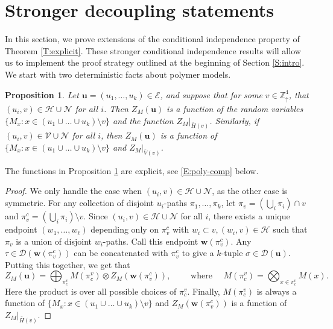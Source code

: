 \documentclass[aop, preprint]{imsart}
\theoremstyle{plain}
\newtheorem{prop}[theorem]{Proposition}%
\theoremstyle{definition}
\theoremstyle{plain}
\newcommand{\sset}{\subset}
\newcommand{\sig}{\sigma}
\newcommand{\scrE}{\mathcal{E}}
\newcommand{\Zd}{\mathds{Z}^4_\uparrow}
\newcommand{\scrD}{\mathcal{D}}
\newcommand{\scrV}{\mathcal{V}}
\newcommand{\scrH}{\mathcal{H}}
\newcommand{\scrN}{\mathcal{N}}
\newcommand{\smin}{\setminus}
\newcommand{\lf}{\left}
\newcommand{\rg}{\right}
\newcommand{\bu}{\mathbf{u}}
\newcommand{\bw}{\mathbf{w}}
\begin{document}
\section{Stronger decoupling statements}
\label{S:framework}
In this section, we prove extensions of the conditional independence property of Theorem \ref{T:explicit}. These stronger conditional independence results will allow us to implement the proof strategy outlined at the beginning of Section \ref{S:intro}. We start with two deterministic facts about polymer models.

\begin{prop}
	\label{P:poly-comp}
	Let $\bu = (u_1, \dots, u_k) \in \scrE$, and suppose that for some $v \in \Zd$, that $(u_i, v) \in \scrH \cup \scrN$ for all $i$. Then $Z_M(\bu)$ is a function of the random variables $\{M_x : x \in (u_1 \cup \dots \cup u_k) \smin v \}$ and the function $Z_M|_{\bar H(v)}$. Similarly, if $(u_i, v) \in \scrV \cup \scrN$ for all $i$, then $Z_M(\bu)$ is a function of $\{M_x : x \in (u_1 \cup \dots \cup u_k) \smin v \}$ and $Z_M|_{\bar V(v)}$.
\end{prop}

The functions in Proposition \ref{P:poly-comp} are explicit, see \eqref{E:poly-comp} below.

\begin{proof}
	We only handle the case when $(u_i, v) \in \scrH \cup \scrN$, as the other case is symmetric. For any collection of disjoint $u_i$-paths $\pi_1, \dots, \pi_k$, let $\pi_v = \lf(\bigcup_i \pi_i \rg) \cap v$ and $\pi_v^c = \lf(\bigcup_i \pi_i \rg) \smin v$. Since $(u_i, v) \in \scrH \cup \scrN$ for all $i$, there exists a unique endpoint $(w_1, \dots, w_\ell)$ depending only on $\pi_v^c$ with $w_i \sset v, (w_i, v) \in \scrH$ such that $\pi_v$ is a union of disjoint $w_i$-paths. Call this endpoint $\bw(\pi_v^c)$. Any $\tau \in \scrD(\bw(\pi^c_v))$ can be concatenated with $\pi_v^c$ to give a $k$-tuple $\sig \in \scrD(\bu)$. Putting this together, we get that
	\begin{equation}
	\label{E:poly-comp}
	Z_M(\bu) = \bigoplus_{\pi^v_c} M(\pi^v_c) \otimes Z_M(\bw(\pi_v^c)) , \qquad \text{ where } \quad M(\pi^v_c) = \bigotimes_{x \in \pi^v_c} M(x).
	\end{equation}
	Here the product is over all possible choices of $\pi^v_c$. Finally, $M(\pi^v_c)$ is always a function of $\{M_x : x \in (u_1 \cup \dots \cup u_k) \smin v \}$ and $Z_M(\bw(\pi_v^c))$ is a function of $Z_M|_{\bar H(v)}$.
\end{proof}
\end{document}
